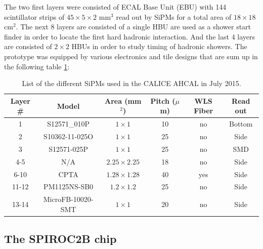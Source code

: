 \documentclass[twoside,a4paper,11pt]{article}
\begin{document}
The two first layers were consisted of ECAL Base Unit (EBU) with 144 scintillator strips of $45\times5\times2$ mm$^3$ read out by SiPMs for a total area of $18\times18$ cm$^2$. The next 8 layers are consisted of a single HBU are used as a shower start finder in order to locate the first hard hadronic interaction. And the last 4 layers are consisted of $2\times2$ HBUs in order to study timing of hadronic showers. The prototype was equipped by various electronics and tile designs that are sum up in the following table \ref{table:sipm_list}:
\begin{table}[htbp]
\centering
    \begin{tabular}{@{} cccccc @{}}
    \hline
    Layer \# & Model & Area (mm$^2$) & Pitch ($\mu$m) & WLS Fiber & Read out \\ \hline
    1 & S12571\_010P & $1\times1$ & 10 & no & Bottom \\ 
    2 & S10362-11-025O & $1\times1$ & 25 & no & Side \\
    3 & S12571-025P & $1\times1$ & 25 & no & SMD \\ 
    4-5 & N/A & $2.25\times2.25$ & 18 & no & Side \\
    6-10 & CPTA & $1.28\times1.28$ & 40 & yes & Side \\ 
    11-12 & PM1125NS-SB0 & $1.2\times1.2$ & 25 & no & Side \\
    13-14 & MicroFB-10020-SMT & $1\times1$ & 20 & no & Side \\
    \hline
    \end{tabular}
     \caption{List of the different SiPMs used in the CALICE AHCAL in July 2015.}
     \label{table:sipm_list}
\end{table}
\subsection{The SPIROC2B chip}
\end{document}
